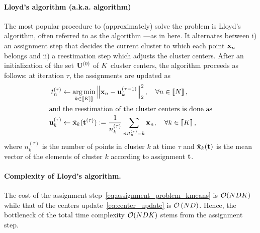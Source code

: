 \paragraph{Lloyd's algorithm (a.k.a. \kmeans algorithm)} The most popular procedure to (approximately) 
solve the \kmeans problem is Lloyd's algorithm, often referred to as the \kmeans algorithm ---as in here.
It alternates between
i) an assignment step that decides the current cluster to which each point ${\mathbf{x}}_n$
belongs and ii) a reestimation step which adjusts the cluster centers.
After an initialization of the set ${\mathbf{U}}^{(0)}$ of $K$
 cluster centers, the algorithm proceeds as follows: at iteration $\tau$,
  the assignments are updated as
\begin{align}
\label{eq:assignment_problem_kmeans}
 t_n^{(\tau)} &\leftarrow \operatorname*{arg\,min}_{k \in \left \llbracket K]\right \rrbracket} \left\|{\mathbf{x}}_{n} - {\mathbf{u}}_{k}^{(\tau-1)}\right\|_2^2,\quad \forall n\in\left \llbracket N\right \rrbracket,\\
\intertext{and the reestimation of the cluster centers is done as}
\label{eq:center_update}
{\mathbf{u}}^{(\tau)}_k &\leftarrow \hat{{\mathbf{x}}}_k({\mathbf{t}}^{(\tau)}) := \frac{1}{n_k^{(\tau)}} \sum_{n:t^{(\tau)}_n= k} {{\mathbf{x}}_{n}},\quad \forall k\in\left \llbracket K\right \rrbracket, 
\end{align}
where $n_k^{(\tau)}$ %
 is the number of points in cluster $k$
at time $\tau$ and $\hat{{\mathbf{x}}}_k({\mathbf{t}})$ is the mean vector of the elements of cluster $k$ according to assignment ${\mathbf{t}}$. 

\paragraph{Complexity of Lloyd's algorithm.} The cost of the assignment step~\eqref{eq:assignment_problem_kmeans} is $\mathcal{O}(NDK)$ while that of the centers update~\eqref{eq:center_update} is $\mathcal{O}\left (ND\right )$. Hence, the bottleneck of the total time complexity $\mathcal{O}(NDK)$ stems from the assignment step. %

